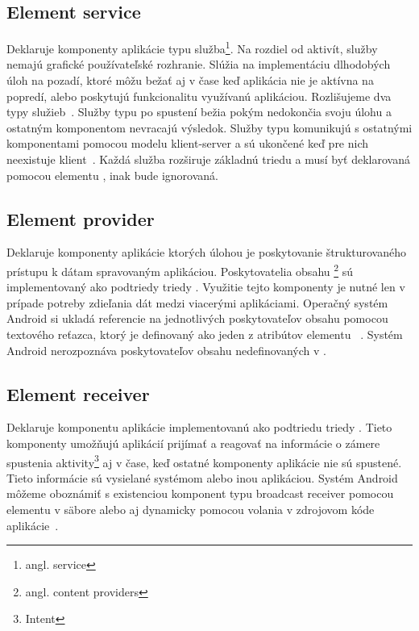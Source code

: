 \subsection{Element service}
Deklaruje komponenty aplikácie typu služba\footnote{angl. service}. Na rozdiel od aktivít, služby nemajú grafické používateľské rozhranie. Slúžia na implementáciu dlhodobých úloh na pozadí, ktoré môžu bežať aj v čase keď aplikácia nie je aktívna na popredí, alebo poskytujú funkcionalitu využívanú aplikáciou. Rozlišujeme dva typy služieb~\cite{elService}. Služby typu  po spustení bežia pokým nedokončia svoju úlohu a ostatným komponentom nevracajú výsledok. Služby typu  komunikujú s ostatnými komponentami pomocou modelu klient-server a sú ukončené keď pre nich neexistuje klient~\cite{boundService}. Každá služba rozširuje základnú triedu  a musí byť deklarovaná pomocou elementu , inak bude ignorovaná.

\subsection{Element provider}
Deklaruje komponenty aplikácie ktorých úlohou je poskytovanie štrukturovaného prístupu k dátam spravovaným aplikáciou. Poskytovatelia obsahu \footnote{angl. content providers} sú implementovaný ako podtriedy triedy . Využitie tejto komponenty je nutné len v prípade potreby zdieľania dát medzi viacerými aplikáciami. Operačný systém Android si ukladá referencie na jednotlivých poskytovateľov obsahu pomocou  textového reťazca, ktorý je definovaný ako jeden z atribútov elementu ~\cite{elContentProvider}. Systém Android nerozpoznáva poskytovateľov obsahu nedefinovaných v .

\subsection{Element receiver}
Deklaruje komponentu aplikácie implementovanú ako podtriedu triedy . Tieto komponenty umožňujú aplikácií prijímať a reagovať na informácie o zámere spustenia aktivity\footnote{Intent} aj v čase, keď ostatné komponenty aplikácie nie sú spustené. Tieto informácie sú vysielané systémom alebo inou aplikáciou. Systém Android môžeme oboznámiť s existenciou komponent typu broadcast receiver pomocou elementu  v säbore  alebo aj dynamicky pomocou volania  v zdrojovom kóde aplikácie~\cite{elReceiver}.

